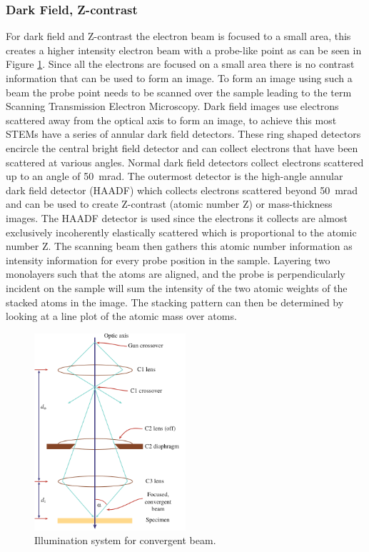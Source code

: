 \subsubsection{Dark Field, Z-contrast}
For dark field and Z-contrast the electron beam is focused to a small area, this creates a higher intensity electron beam with a probe-like point as can be seen in Figure \ref{fig:stem_operating}. Since all the electrons are focused on a small area there is no contrast information that can be used to form an image. To form an image using such a beam the probe point needs to be scanned over the sample leading to the term Scanning Transmission Electron Microscopy.
Dark field images use electrons scattered away from the optical axis to form an image, to achieve this most STEMs have a series of annular dark field detectors.
These ring shaped detectors encircle the central bright field detector and can collect electrons that have been scattered at various angles. Normal dark field detectors collect electrons scattered up to an angle of \SI{50}{\milli \radian}. The outermost detector is the high-angle annular dark field detector (HAADF) which collects electrons scattered beyond \SI{50}{\milli \radian} and can be used to create Z-contrast (atomic number Z) or mass-thickness images.
The HAADF detector is used since the electrons it collects are almost exclusively incoherently elastically scattered which is proportional to the atomic number Z.
The scanning beam then gathers this atomic number information as intensity information for every probe position in the sample.
Layering two monolayers such that the atoms are aligned, and the probe is perpendicularly incident on the sample will sum the intensity of the two atomic weights of the stacked atoms in the image. The stacking pattern can then be determined by looking at a line plot of the atomic mass over atoms.  
\begin{figure}[h]
    \centering
    \includegraphics[width=0.5\textwidth, keepaspectratio]{resources/Figures/stem_operating.png}
    \caption{Illumination system for convergent beam.}
    \label{fig:stem_operating}
\end{figure}

